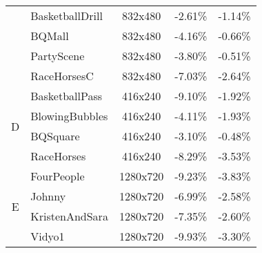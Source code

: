 \begin{table}[!p]
\begin{tabular}{@{}clccc@{}}
                                         & BasketballDrill                           & 832x480                 & -2.61\%                            & -1.14\%                       \\
                                         & BQMall                                    & 832x480                 & -4.16\%                            & -0.66\%                       \\
                                         & PartyScene                                & 832x480                 & -3.80\%                            & -0.51\%                       \\
                                         & RaceHorsesC                               & 832x480                 & -7.03\%                            & -2.64\%                       \\
        \multirow{4}{*}{D}               & BasketballPass                            & 416x240                 & -9.10\%                            & -1.92\%                       \\
                                         & BlowingBubbles                            & 416x240                 & -4.11\%                            & -1.93\%                       \\
                                         & BQSquare                                  & 416x240                 & -3.10\%                            & -0.48\%                       \\
                                         & RaceHorses                                & 416x240                 & -8.29\%                            & -3.53\%                       \\
        \multirow{6}{*}{E}               & FourPeople                                & 1280x720                & -9.23\%                            & -3.83\%                       \\
                                         & Johnny                                    & 1280x720                & -6.99\%                            & -2.58\%                       \\
                                         & KristenAndSara                            & 1280x720                & -7.35\%                            & -2.60\%                       \\
                                         & Vidyo1                                    & 1280x720                & -9.93\%                            & -3.30\%                       \\

\end{tabular}
\end{table}
